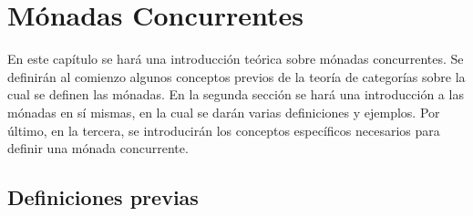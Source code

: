 \chapter{M\'onadas Concurrentes}\label{chapter:monconc}

En este capítulo se hará una introducción teórica sobre mónadas concurrentes. Se definirán al comienzo algunos conceptos previos de la teoría de categorías sobre la cual se definen las mónadas. En la segunda sección se hará una introducción a las mónadas en sí mismas, en la cual se darán varias definiciones y ejemplos. Por último, en la tercera, se introducirán los conceptos específicos necesarios para definir una mónada concurrente. 

\section{Definiciones previas}\label{monconc:previas}

